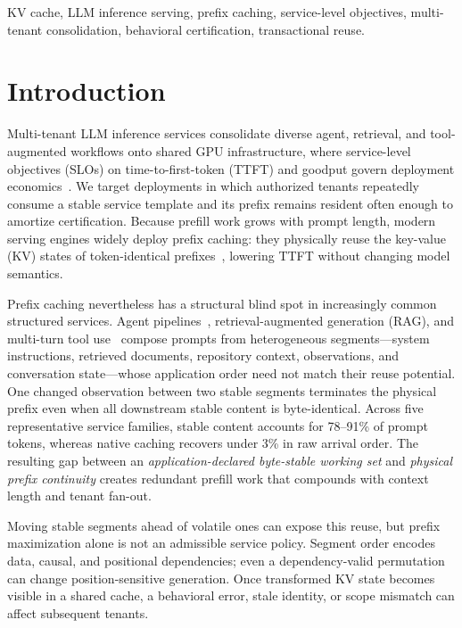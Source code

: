 \documentclass[journal]{IEEEtran}
\begin{document}
\begin{IEEEkeywords}
KV cache, LLM inference serving, prefix caching, service-level objectives, multi-tenant consolidation, behavioral certification, transactional reuse.
\end{IEEEkeywords}

\section{Introduction}
\label{sec:introduction}

Multi-tenant LLM inference services consolidate diverse agent, retrieval, and tool-augmented workflows onto shared GPU infrastructure, where service-level objectives (SLOs) on time-to-first-token (TTFT) and goodput govern deployment economics~\cite{vllm2023,sglang2024}. We target deployments in which authorized tenants repeatedly consume a stable service template and its prefix remains resident often enough to amortize certification. Because prefill work grows with prompt length, modern serving engines widely deploy prefix caching: they physically reuse the key-value (KV) states of token-identical prefixes~\cite{vllm2023,sglang2024}, lowering TTFT without changing model semantics.

Prefix caching nevertheless has a structural blind spot in increasingly common structured services. Agent pipelines~\cite{react2023}, retrieval-augmented generation (RAG), and multi-turn tool use~\cite{toolformer2023} compose prompts from heterogeneous segments---system instructions, retrieved documents, repository context, observations, and conversation state---whose application order need not match their reuse potential. One changed observation between two stable segments terminates the physical prefix even when all downstream stable content is byte-identical. Across five representative service families, stable content accounts for 78--91\% of prompt tokens, whereas native caching recovers under 3\% in raw arrival order. The resulting gap between an \emph{application-declared byte-stable working set} and \emph{physical prefix continuity} creates redundant prefill work that compounds with context length and tenant fan-out.

Moving stable segments ahead of volatile ones can expose this reuse, but prefix maximization alone is not an admissible service policy. Segment order encodes data, causal, and positional dependencies; even a dependency-valid permutation can change position-sensitive generation. Once transformed KV state becomes visible in a shared cache, a behavioral error, stale identity, or scope mismatch can affect subsequent tenants.
\end{document}
